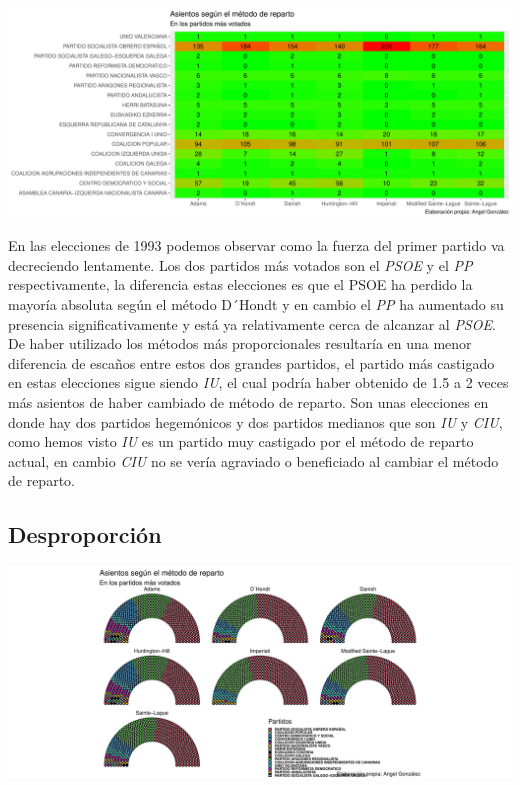 \documentclass[12pt,a4paper,]{book}
\numberwithin{dummy}{section}
\theoremstyle{ocrenumbox}
\theoremstyle{blacknumex}
\theoremstyle{blacknumbox}
\theoremstyle{ocrenum}
\theoremstyle{ocrenum}
\begin{document}
\begin{center}\includegraphics[width=1\linewidth]{figurasR/unnamed-chunk-88-2} \end{center}

En las elecciones de 1993 podemos observar como la fuerza del primer
partido va decreciendo lentamente. Los dos partidos más votados son el
\emph{PSOE} y el \emph{PP} respectivamente, la diferencia estas
elecciones es que el PSOE ha perdido la mayoría absoluta según el método
D´Hondt y en cambio el \emph{PP} ha aumentado su presencia
significativamente y está ya relativamente cerca de alcanzar al
\emph{PSOE}. De haber utilizado los métodos más proporcionales
resultaría en una menor diferencia de escaños entre estos dos grandes
partidos, el partido más castigado en estas elecciones sigue siendo
\emph{IU}, el cual podría haber obtenido de 1.5 a 2 veces más asientos
de haber cambiado de método de reparto. Son unas elecciones en donde hay
dos partidos hegemónicos y dos partidos medianos que son \emph{IU} y
\emph{CIU}, como hemos visto \emph{IU} es un partido muy castigado por
el método de reparto actual, en cambio \emph{CIU} no se vería agraviado
o beneficiado al cambiar el método de reparto.

\hypertarget{desproporciuxf3n-5}{%
\subsection{Desproporción}\label{desproporciuxf3n-5}}

\begin{center}\includegraphics[width=1\linewidth]{figurasR/unnamed-chunk-89-1} \end{center}
\end{document}
